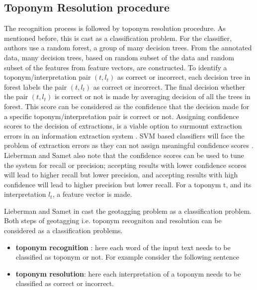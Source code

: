 \documentclass[
     11pt,         %
     a4paper,      %
     oneside,
     ]{article}
\begin{document}
\subsection{Toponym Resolution procedure}
The recognition process is followed by toponym resolution procedure. As mentioned before, this is cast as a classification problem. For the classifier, authors use a random forest, a group of many decision trees. From the annotated data, many decision trees, based on random subset of the data and random subset of the features from feature vectors, are constructed. To identify a toponym/interpretation pair $(t,l_t)$ as correct or incorrect, each decision tree in forest labels the pair $(t,l_t)$ as correct or incorrect. The final decision whether the pair $(t,l_t)$ is correct or not is made by averaging decision of all the trees in forest. This score can  be considered as the confidence that the decision made for a specific toponym/interpretation pair is correct or not. Assigning confidence scores to the decision of extractions, is a viable option to surmount extraction errors in an information extraction system \cite{Sarawagi:2008:IE:1498844.1498845}. SVM based classifiers will face the problem of extraction errors as they can not assign meaningful confidence scores \cite{Lieberman12adaptivecontext}. Lieberman and Samet also note that the confidence scores can be used to tune the system for recall or precision; accepting results with lower confidence scores will lead to higher recall but lower precision, and accepting results with high confidence will lead to higher precision but lower recall.
For a toponym t, and its interpretation $l_t$, a feature vector is made. 

Lieberman and Samet in \cite{Lieberman12adaptivecontext} cast the geotagging problem as a classification problem. Both steps of geotagging i.e. toponym recogniton and resolution can be considered as a classification problems.
\begin{itemize}
	\item \textbf{toponym recognition }: here each word of the input text needs to be classified as toponym or not. For example consider the following sentence
	\item \textbf{toponym resolution}: here each interpretation of a toponym needs to be classified as correct or incorrect.
\end{itemize}
\end{document}
